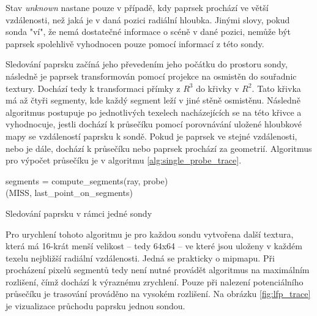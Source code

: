Stav \textit{unknown} nastane pouze v případě, kdy paprsek prochází ve větší vzdálenosti, než jaká je v daná pozici radiální hloubka. Jinými slovy, pokud sonda "ví", že nemá dostatečné informace o scéně v dané pozici, nemůže být paprsek spolehlivě vyhodnocen pouze pomocí informací z této sondy. 

Sledování paprsku začíná jeho převedením jeho počátku do prostoru sondy, následně je paprsek transformován pomocí projekce na osmistěn do souřadnic textury. Dochází tedy k transformaci přímky z $R^3$ do křivky v $R^2$. Tato křivka má až čtyři segmenty, kde každý segment leží v jiné stěně osmistěnu. Následně algoritmus postupuje po jednotlivých texelech nacházejících se na této křivce a vyhodnocuje, jestli dochází k průsečíku pomocí porovnávání uložené hloubkové mapy se vzdáleností paprsku k sondě. Pokud je paprsek ve stejné vzdálenosti, nebo je dále, dochází k průsečíku nebo paprsek prochází za geometrií. Algoritmus pro výpočet průsečíku je v algoritmu \ref{alg:single_probe_trace}. 

\begin{center}
	\begin{czechalgorithm}[H] \label{alg:single_probe_trace}
	    segments = compute\_segments(ray, probe)\\
	    \KwRet (MISS, last\_point\_on\_segments)
		\caption{Sledování paprsku v rámci jedné sondy}
	\end{czechalgorithm}
\end{center}

Pro urychlení tohoto algoritmu je pro každou sondu vytvořena další textura, která má 16-krát menší velikost -- tedy 64x64 -- ve které jsou uloženy v každém texelu nejbližší radiální vzdálenosti. Jedná se prakticky o mipmapu. Při procházení pixelů segmentů tedy není nutné provádět algoritmus na maximálním rozlišení, čímž dochází k výraznému zrychlení. Pouze při nalezení potenciálního průsečíku je trasování prováděno na vysokém rozlišení. Na obrázku \ref{fig:lfp_trace} je vizualizace průchodu paprsku jednou sondou.

